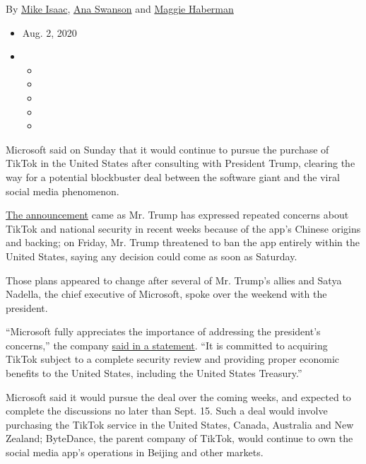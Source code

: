 By \href{https://www.nytimes3xbfgragh.onion/by/mike-isaac}{Mike Isaac},
\href{https://www.nytimes3xbfgragh.onion/by/ana-swanson}{Ana Swanson}
and \href{https://www.nytimes3xbfgragh.onion/by/maggie-haberman}{Maggie
Haberman}

\begin{itemize}
\item
  Aug. 2, 2020
\item
  \begin{itemize}
  \item
  \item
  \item
  \item
  \item
  \end{itemize}
\end{itemize}

Microsoft said on Sunday that it would continue to pursue the purchase
of TikTok in the United States after consulting with President Trump,
clearing the way for a potential blockbuster deal between the software
giant and the viral social media phenomenon.

\href{https://blogs.microsoft.com/blog/2020/08/02/microsoft-to-continue-discussions-on-potential-tiktok-purchase-in-the-united-states/}{The
announcement} came as Mr. Trump has expressed repeated concerns about
TikTok and national security in recent weeks because of the app's
Chinese origins and backing; on Friday, Mr. Trump threatened to ban the
app entirely within the United States, saying any decision could come as
soon as Saturday.

Those plans appeared to change after several of Mr. Trump's allies and
Satya Nadella, the chief executive of Microsoft, spoke over the weekend
with the president.

``Microsoft fully appreciates the importance of addressing the
president's concerns,'' the company
\href{https://blogs.microsoft.com/blog/2020/08/02/microsoft-to-continue-discussions-on-potential-tiktok-purchase-in-the-united-states/}{said
in a statement}. ``It is committed to acquiring TikTok subject to a
complete security review and providing proper economic benefits to the
United States, including the United States Treasury.''

Microsoft said it would pursue the deal over the coming weeks, and
expected to complete the discussions no later than Sept. 15. Such a deal
would involve purchasing the TikTok service in the United States,
Canada, Australia and New Zealand; ByteDance, the parent company of
TikTok, would continue to own the social media app's operations in
Beijing and other markets.


